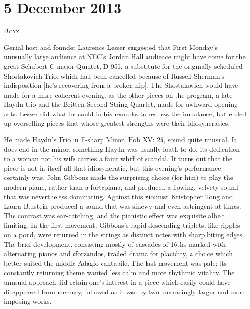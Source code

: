 \chapter{5 December 2013}

\textsc{Boxx}

Genial host and founder Laurence Lesser suggested that First Monday’s unusually large audience at NEC’s Jordan Hall audience might have come for the great Schubert C major Quintet, D 956, a substitute for the originally scheduled Shostakovich Trio, which had been cancelled because of Russell Sherman’s indisposition [he’s recovering from a broken hip]. The Shostakovich would have made for a more coherent evening, as the other pieces on the program, a late Haydn trio and the Britten Second String Quartet, made for awkward opening acts. Lesser did what he could in his remarks to redress the imbalance, but ended up overselling pieces that whose greatest strengths were their idiosyncrasies.

He made Haydn’s Trio in F-sharp Minor, Hob XV: 26, sound quite unusual. It does end in the minor, something Haydn was usually loath to do, its dedication to a woman not his wife carries a faint whiff of scandal. It turns out that the piece is not in itself all that idiosyncratic, but this evening’s performance certainly was. John Gibbons made the surprising choice (for him) to play the modern piano, rather than a fortepiano, and produced a flowing, velvety sound that was nevertheless dominating. Against this violinist Kristopher Tong and Laura Blustein produced a sound that was sinewy and even astringent at times. The contrast was ear-catching, and the pianistic effect was exquisite albeit limiting. In the first movement, Gibbons’s rapid descending triplets, like ripples on a pond, were returned in the strings as distinct notes with sharp biting edges. The brief development, consisting mostly of cascades of 16ths marked with alternating pianos and sforzandos, traded drama for placidity, a choice which better suited the middle Adagio cantabile. The last movement was pale; its constantly returning theme wanted less calm and more rhythmic vitality. The unusual approach did retain one’s interest in a piece which easily could have disappeared from memory, followed as it was by two increasingly larger and more imposing works.

